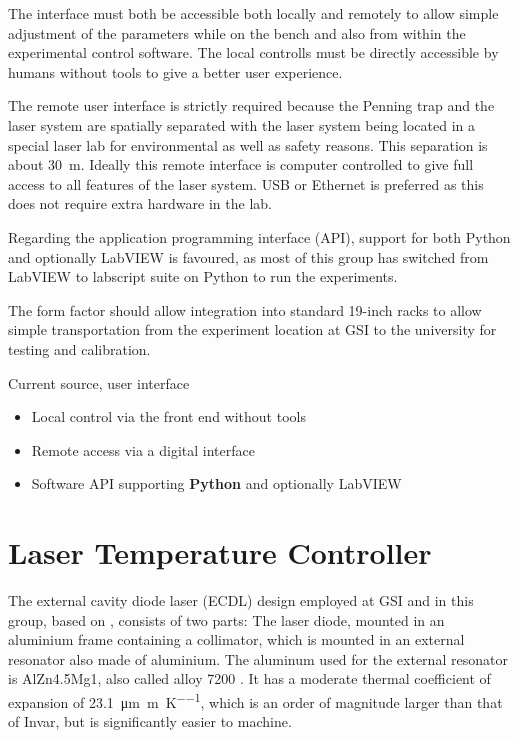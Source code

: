 The interface must both be accessible both locally and remotely to allow simple adjustment of the parameters while on the bench and also from within the experimental control software. The local controlls must be directly accessible by humans without tools to give a better user experience.

The remote user interface is strictly required because the Penning trap and the laser system are spatially separated with the laser system being located in a special laser lab for environmental as well as safety reasons. This separation is about \qty{30}{\meter}. Ideally this remote interface is computer controlled to give full access to all features of the laser system. USB or Ethernet is preferred as this does not require extra hardware in the lab.

Regarding the application programming interface (API), support for both Python and optionally LabVIEW is favoured, as most of this group has switched from LabVIEW to labscript suite \cite{labscript_2013} on Python to run the experiments.

The form factor should allow integration into standard 19-inch racks to allow simple transportation from the experiment location at GSI to the university for testing and calibration.

\begin{center}
    \begin{specifications}[label={lst:dgDrive_specs_api}]{Current source, user interface}
    \begin{itemize}
        \item Local control via the front end without tools
        \item Remote access via a digital interface
        \item Software API supporting \textbf{Python} and optionally LabVIEW
    \end{itemize}
    \end{specifications}
\end{center}

\clearpage
\section{Laser Temperature Controller}%
\label{sec:laser_temperatrure_controller}
The external cavity diode laser (ECDL) design employed at GSI and in this group, based on \cite{ecdl_paris}, consists of two parts: The laser diode, mounted in an aluminium frame containing a collimator, which is mounted in an external resonator also made of aluminium. The aluminum used for the external resonator is AlZn4.5Mg1, also called alloy 7200 \cite{datasheet_laser_alu}. It has a moderate thermal coefficient of expansion of \qty{23.1}{\micro \meter \per \m \per \K}, which is an order of magnitude larger than that of Invar, but is significantly easier to machine.

